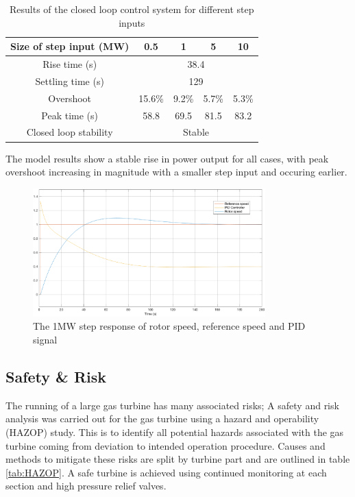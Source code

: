 \documentclass[11pt, oneside]{article}
\begin{document}
 \begin {table} [h]
\begin{center}
\caption{Results of the closed loop control system for different step inputs} \label{tab:controlresults} 
\begin{tabular}{ |c|c|c|c|c|}
 \hline
 Size of step input (MW) & 0.5 & 1 & 5 & 10\\
 \hline
  Rise time (s) & \multicolumn{4}{|c|}{38.4}\\ 
 \hline
  Settling time (s) & \multicolumn{4}{|c|}{129}\\ 
  \hline
  Overshoot & 15.6\% & 9.2\% & 5.7\% & 5.3\%\\ 
  \hline
  Peak time (s) & 58.8 & 69.5 & 81.5 & 83.2 \\
 \hline
 Closed loop stability & \multicolumn{4}{|c|}{Stable}\\
 \hline
\end{tabular}
\end{center}  
\end {table}

The model results show a stable rise in power output for all cases, with peak overshoot increasing in magnitude with a smaller step input and occuring earlier.


\begin{figure} [h]
\centering
\includegraphics[width=0.8\textwidth]{./pictures/scope.eps}
  \caption{The 1MW step response of rotor speed, reference speed and PID signal} \label{fig:scope}
  \end{figure}

\subsection{Safety \& Risk}
The running of a large gas turbine has many associated risks; A safety and risk analysis was carried out for the gas turbine using a hazard and operability (HAZOP) study. This is to identify all potential hazards associated with the gas turbine coming from deviation to intended operation procedure. Causes and methods to mitigate these risks are split by turbine part and are outlined in table \ref{tab:HAZOP}. A safe turbine is achieved using continued monitoring at each section and high pressure relief valves.
\end{document}
